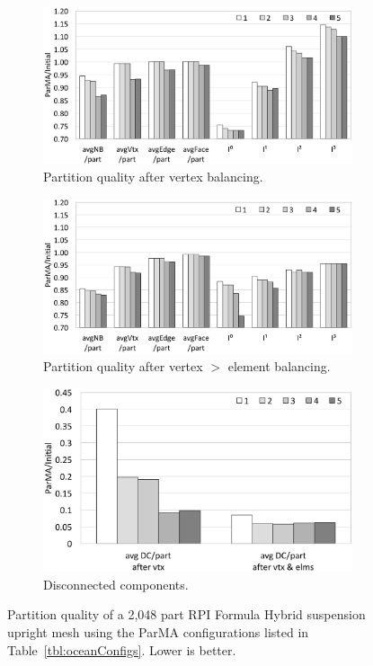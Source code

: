 \begin{figure} \centering
  \begin{subfigure}[b]{.7\textwidth}
    \includegraphics[width=\textwidth]{results/configTest/up11/up11_32_vtxVsInitial.eps}
    \caption{Partition quality after vertex balancing.}
    \label{fig:up11_32vtx}
  \end{subfigure}
  \begin{subfigure}[b]{.7\textwidth}
    \includegraphics[width=\textwidth]{results/configTest/up11/up11_32_elmVsInitial.eps}
    \caption{Partition quality after vertex $>$ element balancing.}
    \label{fig:up11_32vtxElm}
  \end{subfigure}
  \begin{subfigure}[b]{.75\textwidth}
    \includegraphics[width=\textwidth]{results/configTest/up11/up11_32_dcParts.eps}
    \caption{Disconnected components.}
    \label{fig:up11_32dc}
  \end{subfigure}
  \caption{
    Partition quality of a 2,048 part RPI Formula Hybrid suspension upright mesh
    using the ParMA configurations listed in Table~\ref{tbl:oceanConfigs}.
    Lower is better.
  }
  \label{fig:up11_32}
\end{figure}

